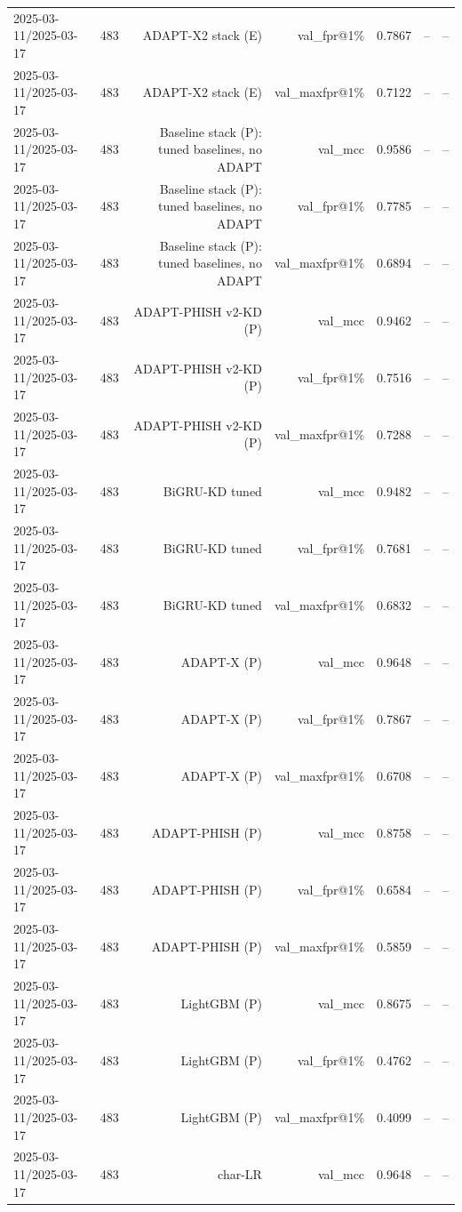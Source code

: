 \begin{table}[t]
\begin{tabular}{llrrrrr}
2025-03-11/2025-03-17 & 483 & ADAPT-X2 stack (E) & val\_fpr@1\% & 0.7867 & -- & -- \\
2025-03-11/2025-03-17 & 483 & ADAPT-X2 stack (E) & val\_maxfpr@1\% & 0.7122 & -- & -- \\
2025-03-11/2025-03-17 & 483 & Baseline stack (P): tuned baselines, no ADAPT & val\_mcc & 0.9586 & -- & -- \\
2025-03-11/2025-03-17 & 483 & Baseline stack (P): tuned baselines, no ADAPT & val\_fpr@1\% & 0.7785 & -- & -- \\
2025-03-11/2025-03-17 & 483 & Baseline stack (P): tuned baselines, no ADAPT & val\_maxfpr@1\% & 0.6894 & -- & -- \\
2025-03-11/2025-03-17 & 483 & ADAPT-PHISH v2-KD (P) & val\_mcc & 0.9462 & -- & -- \\
2025-03-11/2025-03-17 & 483 & ADAPT-PHISH v2-KD (P) & val\_fpr@1\% & 0.7516 & -- & -- \\
2025-03-11/2025-03-17 & 483 & ADAPT-PHISH v2-KD (P) & val\_maxfpr@1\% & 0.7288 & -- & -- \\
2025-03-11/2025-03-17 & 483 & BiGRU-KD tuned & val\_mcc & 0.9482 & -- & -- \\
2025-03-11/2025-03-17 & 483 & BiGRU-KD tuned & val\_fpr@1\% & 0.7681 & -- & -- \\
2025-03-11/2025-03-17 & 483 & BiGRU-KD tuned & val\_maxfpr@1\% & 0.6832 & -- & -- \\
2025-03-11/2025-03-17 & 483 & ADAPT-X (P) & val\_mcc & 0.9648 & -- & -- \\
2025-03-11/2025-03-17 & 483 & ADAPT-X (P) & val\_fpr@1\% & 0.7867 & -- & -- \\
2025-03-11/2025-03-17 & 483 & ADAPT-X (P) & val\_maxfpr@1\% & 0.6708 & -- & -- \\
2025-03-11/2025-03-17 & 483 & ADAPT-PHISH (P) & val\_mcc & 0.8758 & -- & -- \\
2025-03-11/2025-03-17 & 483 & ADAPT-PHISH (P) & val\_fpr@1\% & 0.6584 & -- & -- \\
2025-03-11/2025-03-17 & 483 & ADAPT-PHISH (P) & val\_maxfpr@1\% & 0.5859 & -- & -- \\
2025-03-11/2025-03-17 & 483 & LightGBM (P) & val\_mcc & 0.8675 & -- & -- \\
2025-03-11/2025-03-17 & 483 & LightGBM (P) & val\_fpr@1\% & 0.4762 & -- & -- \\
2025-03-11/2025-03-17 & 483 & LightGBM (P) & val\_maxfpr@1\% & 0.4099 & -- & -- \\
2025-03-11/2025-03-17 & 483 & char-LR & val\_mcc & 0.9648 & -- & -- \\

\end{tabular}
\end{table}
